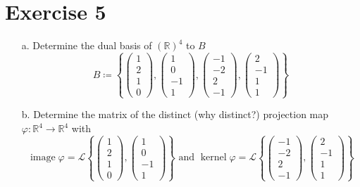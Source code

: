 \documentclass[a4paper]{article}
\theoremstyle{definition}
\DeclareMathOperator\kernel{kernel}
\DeclareMathOperator\image{image}
\newcommand\set[1]{\left\{#1\right\}}
\begin{document}
\section*{Exercise 5}
\begin{ex}
  \begin{enumerate}
    \item[a.] Determine the dual basis of $(\mathbb R)^4$ to $B$
    \[
      B \coloneqq \set{
        \begin{pmatrix} 1 \\ 2 \\ 1 \\ 0 \end{pmatrix},
        \begin{pmatrix} 1 \\ 0 \\ -1 \\ 1 \end{pmatrix},
        \begin{pmatrix} -1 \\ -2 \\ 2 \\ -1 \end{pmatrix},
        \begin{pmatrix} 2 \\ -1 \\ 1 \\ 1 \end{pmatrix}
      }
    \]

    \item[b.] Determine the matrix of the distinct (why distinct?) projection map
      $\varphi: \mathbb R^4 \to \mathbb R^4$ with
      \[
        \image{\varphi} = \mathcal L\set{\begin{pmatrix} 1 \\ 2 \\ 1 \\ 0 \end{pmatrix}, \begin{pmatrix} 1 \\ 0 \\ -1 \\ 1 \end{pmatrix}}
        \text{ and }
        \kernel{\varphi} = \mathcal L\set{\begin{pmatrix} -1 \\ -2 \\ 2 \\ -1 \end{pmatrix}, \begin{pmatrix} 2 \\ -1 \\ 1 \\ 1 \end{pmatrix}}
      \]
  \end{enumerate}
\end{ex}
\end{document}
